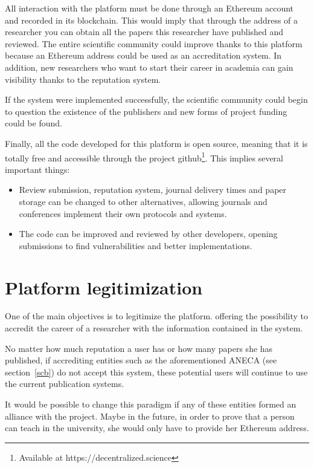 All interaction with the platform must be done through an Ethereum account and
recorded in its blockchain. This would imply that through the address of a
researcher you can obtain all the papers this researcher have published and
reviewed. The entire scientific community could improve thanks to this platform
because an Ethereum address could be used as an accreditation system. In
addition, new researchers who want to start their career in academia can gain
visibility thanks to the reputation system.

If the system were implemented successfully, the scientific community could
begin to question the existence of the publishers and new forms of project
funding could be found.


Finally, all the code developed for this platform is open source, meaning that
it is totally free and accessible through the project github\footnote{Available
  at https://decentralized.science}. This implies several important things:

\begin{itemize}
\item Review submission, reputation system, journal delivery times and paper
  storage can be changed to other alternatives, allowing journals and
  conferences implement their own protocols and systems.
\item The code can be improved and reviewed by other developers, opening
  submissions to find vulnerabilities and better implementations.
\end{itemize}

\section{Platform legitimization}

One of the main objectives is to legitimize the platform. offering the
possibility to accredit the career of a researcher with the information contained
in the system.

No matter how much reputation a user has or how many papers she has published,
if accrediting entities such as the aforementioned ANECA (see section~\ref{scb})
do not accept this system, these potential users will continue to use the
current publication systems.

It would be possible to change this paradigm if any of these entities formed an
alliance with the project. Maybe in the future, in order to prove that a person
can teach in the university, she would only have to provide her Ethereum
address.




